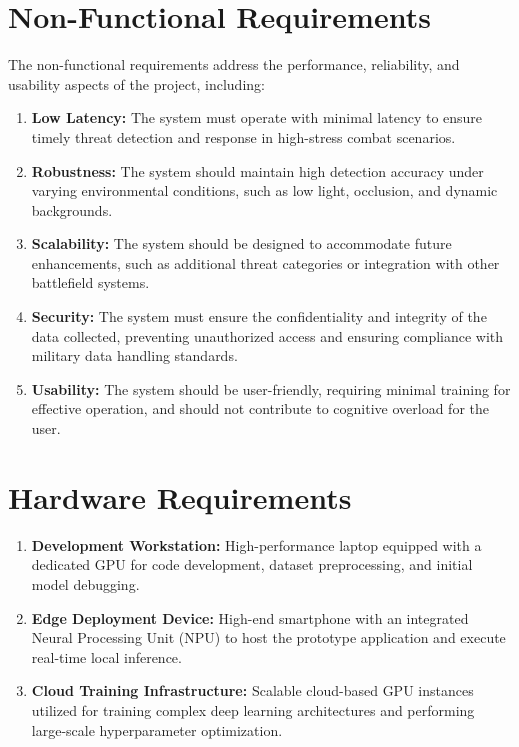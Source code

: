 \section{Non-Functional Requirements}\label{sec:nonfunctional}
The non-functional requirements address the performance, reliability, and usability aspects of the
project, including:
\begin{enumerate}[label=\roman*.]
  \item \textbf{Low Latency:} The system must operate with minimal latency to ensure timely threat
    detection and response in high-stress combat scenarios.
  \item \textbf{Robustness:} The system should maintain high detection accuracy under varying
    environmental conditions, such as low light, occlusion, and dynamic backgrounds.
  \item \textbf{Scalability:} The system should be designed to accommodate future enhancements, such
    as additional threat categories or integration with other battlefield systems.
  \item \textbf{Security:} The system must ensure the confidentiality and integrity of the data
    collected, preventing unauthorized access and ensuring compliance with military data handling
    standards.
  \item \textbf{Usability:} The system should be user-friendly, requiring minimal training for
    effective operation, and should not contribute to cognitive overload for the user.
  \label{end:nonfunctional}
\end{enumerate}
\section{Hardware Requirements}\label{sec:hardware}
\begin{enumerate}[label=\roman*.]
  \item \textbf{Development Workstation:} High-performance laptop equipped with a dedicated GPU for
    code development, dataset preprocessing, and initial model debugging.
  \item \textbf{Edge Deployment Device:} High-end smartphone with an integrated Neural Processing
    Unit (NPU) to host the prototype application and execute real-time local inference.
  \item \textbf{Cloud Training Infrastructure:} Scalable cloud-based GPU instances utilized for
    training complex deep learning architectures and performing large-scale hyperparameter
    optimization.
  \label{end:hardware}
\end{enumerate}
